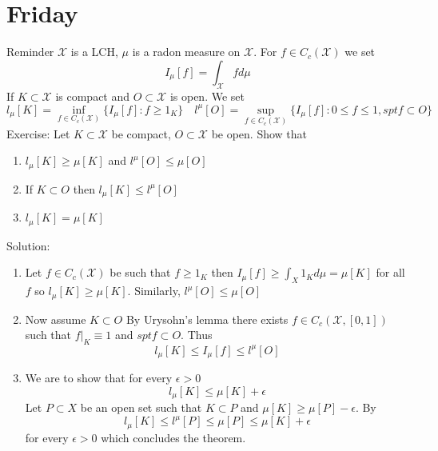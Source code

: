 \documentclass[11pt]{article}
\begin{document}
\section{Friday}
Reminder $ \mathcal{X}$ is a LCH, 
$\mu$ is a radon measure on $ \mathcal{X}$. For $f \in C_c( \mathcal{X})$ we set
\[
    I_\mu[f] = \int_{ \mathcal{X}}^{}f d\mu
\] 
If $ K \subset \mathcal{X}$ is compact and $O \subset \mathcal{X}$ is open. We set
\[
    l_\mu[K] = \inf_{f \in C_c( \mathcal{X})} \{I_\mu[f]: f \ge 1_K\} \quad l^{\mu}[O] = \sup_{f \in C_c( \mathcal{X})}\{I_\mu[f] : 0 \le f \le 1, spt f \subset O\}
\] 
Exercise: Let $K \subset \mathcal{X}$ be compact,  $O \subset \mathcal{X}$ be open. Show that
\begin{enumerate}
    \item $l_\mu[K] \ge \mu[K]$ and $l^{\mu}[O] \le \mu[O]$ 
    \item  If $K \subset O$ then
        $l_\mu[K] \le l^{\mu}[O]$ 
    \item $l_\mu[K] = \mu[K]$
\end{enumerate}
Solution:
\begin{enumerate}
    \item Let $f \in C_c( \mathcal{X})$ be such that $f \ge 1_K$ then  $I_\mu[f] \ge \int_{X}^{}1_K d \mu = \mu[K]$ for all $f$ so
        $l_\mu[K] \ge \mu[K]$. Similarly, $l^{\mu}[O] \le \mu[O]$ 
    \item Now assume $K \subset O$ By Urysohn's lemma there exists $f \in C_c( \mathcal{X},[0,1])$ such that $f|_K \equiv 1$ and  $spt f \subset O$.
        Thus
        \[
            l_\mu[K] \le I_\mu[f] \le l^{\mu}[O]
        \] 
    \item We are to show that for every $\epsilon > 0$ 
         \[
             l_\mu[K] \le \mu[K] + \epsilon
        \] 
        Let $P \subset X$ be an open set such that $K \subset P$ and $\mu[K] \ge \mu[P] - \epsilon$.
        By
        \[
            l_\mu[K] \le l^{\mu}[P] \le \mu[P] \le \mu[K] + \epsilon
        \] 
        for every $\epsilon > 0$ which concludes the theorem.
\end{enumerate}
\end{document}
